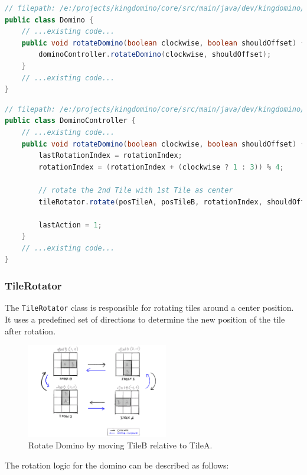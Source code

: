 \documentclass[conference]{IEEEtran}
\begin{document}
\begin{lstlisting}[language=Java]
// filepath: /e:/projects/kingdomino/core/src/main/java/dev/kingdomino/game/Domino.java
public class Domino {
    // ...existing code...
    public void rotateDomino(boolean clockwise, boolean shouldOffset) {
        dominoController.rotateDomino(clockwise, shouldOffset);
    }
    // ...existing code...
}
\end{lstlisting}

\begin{lstlisting}[language=Java]
// filepath: /e:/projects/kingdomino/core/src/main/java/dev/kingdomino/game/DominoController.java
public class DominoController {
    // ...existing code...
    public void rotateDomino(boolean clockwise, boolean shouldOffset) {
        lastRotationIndex = rotationIndex;
        rotationIndex = (rotationIndex + (clockwise ? 1 : 3)) % 4;

        // rotate the 2nd Tile with 1st Tile as center
        tileRotator.rotate(posTileA, posTileB, rotationIndex, shouldOffset);

        lastAction = 1;
    }
    // ...existing code...
}
\end{lstlisting}

\subsubsection{TileRotator}

The \texttt{TileRotator} class is responsible for rotating tiles around a
center position. It uses a predefined set of directions to determine the new
position of the tile after rotation.

\begin{figure}[htbp]
    \centerline{\includegraphics[width=0.55\textwidth]{assets/rotate.png}}
    \caption{Rotate Domino by moving TileB relative to TileA.}\label{fig:rotate}
\end{figure}

The rotation logic for the domino can be described as follows:
\end{document}
